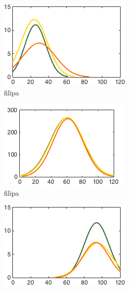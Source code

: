 \begin{figure}[h]
        \centering
        \begin{subfigure}[h]{0.32\textwidth}
                \includegraphics[width=\textwidth]{./img/5/ADEhard}
                \caption{filipa}
                \label{fig:ADEhard}
        \end{subfigure}
        \begin{subfigure}[h]{0.32\textwidth}
                \includegraphics[width=\textwidth]{./img/5/ADEmedium}
                \caption{filipa}
                \label{fig:ADEmedium}
        \end{subfigure}
        \begin{subfigure}[h]{0.32\textwidth}
                \includegraphics[width=\textwidth]{./img/5/ADEeasy}

\end{subfigure}
\end{figure}
